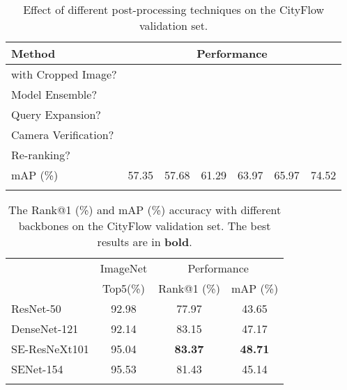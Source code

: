 \documentclass[journal]{IEEEtran}
\begin{document}
\begin{table}
\caption{Effect of different post-processing techniques on the CityFlow validation set.}
\label{table:post}
\vspace{-.2in}
\begin{center}
{
\setlength{\tabcolsep}{3pt}
\begin{tabular}{l|c c c c c c }
\shline
Method & \multicolumn{6}{c}{Performance} \\
\hline
with Cropped Image? & &  &  &  &  &  \\
Model Ensemble? & & &  &  &  & \\
Query Expansion? & & & &  &  &  \\
Camera Verification? & & & & &  &   \\
Re-ranking?  & & & & & &  \\
\hline
mAP (\%) & 57.35 & 57.68 & 61.29 & 63.97 & 65.97 & 74.52 \\
\shline
\end{tabular}}
\end{center}
\vspace{-.1in}
\end{table}

\begin{table}
\caption{The Rank@1 (\%) and mAP (\%) accuracy with different backbones on the CityFlow validation set. The best results are in \textbf{bold}. }
\label{table:backbones}
\vspace{-.2in}
\begin{center}
{
\setlength{\tabcolsep}{8pt}
\begin{tabular}{l| c| c c}
\shline
\multirow{2}{*}{Backbones} & ImageNet & \multicolumn{2}{c}{Performance}\\
 & Top5(\%) & Rank@1 (\%) & mAP (\%) \\
\hline
ResNet-50 \cite{he2016deep} & 92.98 &77.97 & 43.65 \\
DenseNet-121 \cite{huang2017densely}& 92.14 &83.15 & 47.17 \\
SE-ResNeXt101 \cite{hu2018senet} & 95.04 &\textbf{83.37} & \textbf{48.71} \\
SENet-154 \cite{hu2018senet}  & 95.53 & 81.43 & 45.14 \\
\shline
\end{tabular}}
\end{center}
\vspace{-.2in}
\end{table}
\end{document}
